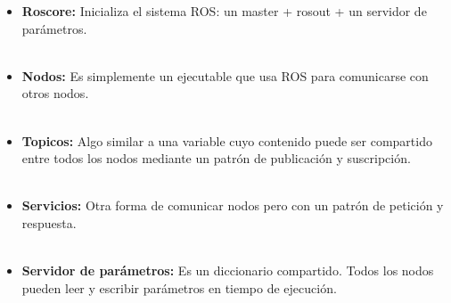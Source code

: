 \documentclass[a4paper]{book}
\begin{document}
\begin{itemize}
\item \textbf{Roscore:} Inicializa el sistema ROS: un master + rosout + un servidor de parámetros.\\
\\	
\item \textbf{Nodos:} Es simplemente un ejecutable que usa ROS para comunicarse con otros nodos.\\
\\
\item \textbf{Topicos:} Algo similar a una variable cuyo contenido puede ser compartido entre todos los nodos mediante un patrón de publicación y suscripción.\\
\\
\item \textbf{Servicios:} Otra forma de comunicar nodos pero con un patrón de petición y respuesta.\\
\\
\item \textbf{Servidor de parámetros:} Es un diccionario compartido. Todos los nodos pueden leer y escribir parámetros en tiempo de ejecución.\\
\end{itemize}
\end{document}
